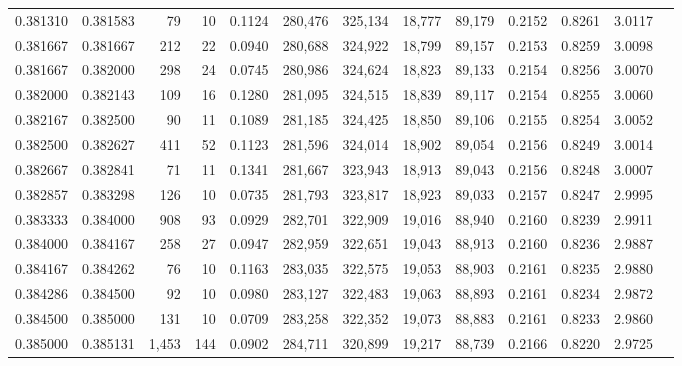\begin{tabular}{rrrrrrrrrrrrr}
0.381310 & 0.381583 &    79 &  10 &                                     0.1124 & 280,476 & 325,134 &  18,777 &  89,179 & 0.2152 & 0.8261 & 3.0117 \\
0.381667 & 0.381667 &   212 &  22 &                                     0.0940 & 280,688 & 324,922 &  18,799 &  89,157 & 0.2153 & 0.8259 & 3.0098 \\
0.381667 & 0.382000 &   298 &  24 &                                     0.0745 & 280,986 & 324,624 &  18,823 &  89,133 & 0.2154 & 0.8256 & 3.0070 \\
0.382000 & 0.382143 &   109 &  16 &                                     0.1280 & 281,095 & 324,515 &  18,839 &  89,117 & 0.2154 & 0.8255 & 3.0060 \\
0.382167 & 0.382500 &    90 &  11 &                                     0.1089 & 281,185 & 324,425 &  18,850 &  89,106 & 0.2155 & 0.8254 & 3.0052 \\
0.382500 & 0.382627 &   411 &  52 &                                     0.1123 & 281,596 & 324,014 &  18,902 &  89,054 & 0.2156 & 0.8249 & 3.0014 \\
0.382667 & 0.382841 &    71 &  11 &                                     0.1341 & 281,667 & 323,943 &  18,913 &  89,043 & 0.2156 & 0.8248 & 3.0007 \\
0.382857 & 0.383298 &   126 &  10 &                                     0.0735 & 281,793 & 323,817 &  18,923 &  89,033 & 0.2157 & 0.8247 & 2.9995 \\
0.383333 & 0.384000 &   908 &  93 &                                     0.0929 & 282,701 & 322,909 &  19,016 &  88,940 & 0.2160 & 0.8239 & 2.9911 \\
0.384000 & 0.384167 &   258 &  27 &                                     0.0947 & 282,959 & 322,651 &  19,043 &  88,913 & 0.2160 & 0.8236 & 2.9887 \\
0.384167 & 0.384262 &    76 &  10 &                                     0.1163 & 283,035 & 322,575 &  19,053 &  88,903 & 0.2161 & 0.8235 & 2.9880 \\
0.384286 & 0.384500 &    92 &  10 &                                     0.0980 & 283,127 & 322,483 &  19,063 &  88,893 & 0.2161 & 0.8234 & 2.9872 \\
0.384500 & 0.385000 &   131 &  10 &                                     0.0709 & 283,258 & 322,352 &  19,073 &  88,883 & 0.2161 & 0.8233 & 2.9860 \\
0.385000 & 0.385131 & 1,453 & 144 &                                     0.0902 & 284,711 & 320,899 &  19,217 &  88,739 & 0.2166 & 0.8220 & 2.9725 \\

\end{tabular}
